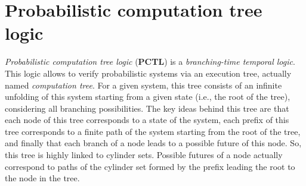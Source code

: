 \section{Probabilistic computation tree logic}
\textit{Probabilistic computation tree logic} (\textbf{PCTL}) is a \textit{branching-time temporal logic}.
This logic allows to verify probabilistic systems via an
execution tree, actually named \textit{computation tree}. For a given system, this tree consists of an infinite unfolding of this system starting from a given state (i.e., the root of the tree), considering
all branching possibilities.
The key ideas behind this tree are that
each node of this tree corresponds to a state of the system,
each prefix of this tree corresponds to a finite path of the system starting from the root of the tree, and finally that
each branch of a node leads to a possible future of this node.
So, this tree is highly linked to cylinder sets.  Possible futures of a node actually correspond to paths of the cylinder set formed by the prefix leading the root to the node in the tree.
